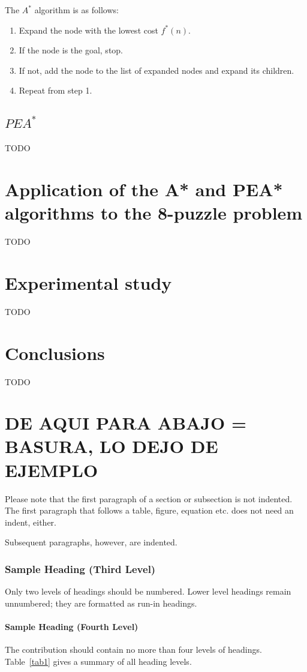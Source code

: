 \documentclass[runningheads]{llncs}
\begin{document}
The \(A^*\) algorithm is as follows:
\begin{enumerate}
\item Expand the node with the lowest cost \(f^*(n)\).
\item If the node is the goal, stop.
\item If not, add the node to the list of expanded nodes and expand its children.
\item Repeat from step 1.
\end{enumerate}

\subsection{\(PEA^*\)}
TODO

\section{Application of the A* and PEA* algorithms to the 8-puzzle problem}
TODO

\section{Experimental study}
TODO

\section{Conclusions}
TODO

\section{DE AQUI PARA ABAJO = BASURA, LO DEJO DE EJEMPLO}
Please note that the first paragraph of a section or subsection is
not indented. The first paragraph that follows a table, figure,
equation etc. does not need an indent, either.

Subsequent paragraphs, however, are indented.

\subsubsection{Sample Heading (Third Level)} Only two levels of
headings should be numbered. Lower level headings remain unnumbered;
they are formatted as run-in headings.

\paragraph{Sample Heading (Fourth Level)}
The contribution should contain no more than four levels of
headings. Table~\ref{tab1} gives a summary of all heading levels.
\end{document}
